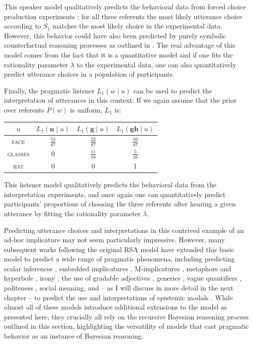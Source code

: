 \noindent This speaker model qualitatively predicts the behavioral data from forced choice production experiments \cite{GoodmanFrank2016}: for all three
referents the most likely utterance choice according to $S_1$ matches the most likely choice in the experimental data. However, this behavior could have
also been predicted by purely symbolic counterfactual reasoning processes as outlined in \cite{Grice1975, Hirschberg1989}. The real advantage of this model 
comes from the fact that it is a quantitative model and if one fits the rationality parameter $\lambda$ to the experimental data, one can also quantitatively predict 
utterance choices in a population of participants.

Finally, the pragmatic listener $L_1(w \mid u)$ can be used to predict the interpretation of utterances in this context. If we again assume that the prior over referents $P(w)$
is uniform, $L_1$ is:

\begin{center}
\begin{tabular}{c | c | c | c} 
$u$ & $L_1( \mathbf{n} \mid u)$ &  $L_1( \mathbf{g} \mid u)$ &  $L_1( \mathbf{gh} \mid u)$ \\ \midrule
\textsc{face} & $\frac{55}{87}$ & $\frac{22}{87}$ & $\frac{10}{87}$  \\
\textsc{glasses} &0  & $\frac{11}{16}$ & $\frac{5}{16}$  \\
\textsc{hat} & 0 & 0 & 1 \\
\end{tabular}
\end{center}

\noindent This listener model qualitatively predicts the behavioral data from the interpretation experiments, and once again one can quantitatively predict participants' proportions
of choosing the three referents after hearing a given utterance by fitting the rationality parameter $\lambda$. 

Predicting utterance choices and interpretations in this contrived example of an ad-hoc implicature may not seem particularly impressive. However, many subsequent works
following the original RSA model have extended this basic model to predict a wide range of pragmatic phenomena, including predicting scalar inferences 
\cite{GoodmanStuhlmuehller2013}, embedded implicatures \cite{Potts2016}, M-implicatures \cite{Bergen2016}, metaphors and hyperbole \cite{Kao2013,Kao2014,Kao2015}, 
irony \cite{Kao,CohnGordon2019}, the use of gradable adjectives \cite{LassiterGoddman2015, QingFranke2014}, generics \cite{Tessler2019}, vague quantifiers 
\cite{SchoellerFranke2017}, politeness \cite{Yoon2019}, social meaning\cite{Burnett2017}, and -- as I will discuss in more detail in the next chapter -- 
to predict the use and interpretations of epistemic modals \cite{HerbstrittFranke2019}. While almost all of these models 
introduce additional extensions to the model as presented here, they crucially all rely on the recursive Bayesian reasoning process outlined in this section,
highlighting the versatility of models that cast pragmatic behavior as an instance of Bayesian reasoning.





